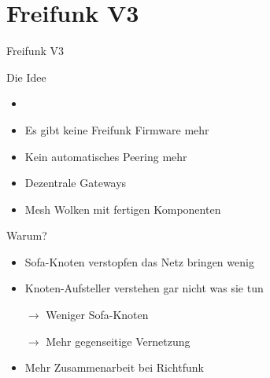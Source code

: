 \section{Freifunk V3}

\begin{frame}{}
    \begin{center}
        Freifunk V3
     \end{center}
\end{frame}

\begin{frame}{Die Idee}
    \begin{itemize}
        \item {}
        \item<3> Es gibt keine Freifunk Firmware mehr
        \item<3> Kein automatisches Peering mehr
        \item<3> Dezentrale Gateways
        \item<3> \glqq{}Mesh Wolken\grqq{} mit fertigen Komponenten
    \end{itemize}
\end{frame}

\begin{frame}{Warum?}
    \begin{itemize}
        \item \glqq{}Sofa-Knoten\grqq{} verstopfen das Netz bringen wenig
        \item Knoten-Aufsteller verstehen gar nicht was sie tun
        \item[$\rightarrow$] Weniger \glqq{}Sofa-Knoten\grqq{}
        \item[$\rightarrow$] Mehr gegenseitige Vernetzung
        \item Mehr Zusammenarbeit bei Richtfunk
    \end{itemize}
\end{frame}
